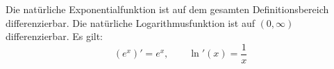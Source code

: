 Die natürliche Exponentialfunktion ist auf dem gesamten Definitionsbereich differenzierbar. Die natürliche Logarithmusfunktion ist auf $(0, \infty)$ differenzierbar. Es gilt:
$$(e^x)' = e^x, \qquad \ln'(x) = \frac{1}{x}$$